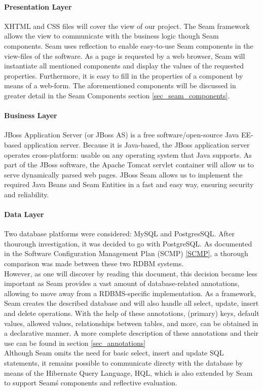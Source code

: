 \documentclass[salesmen, twoside]{../../../templates/latex/2009/softproj}
\begin{document}
\begin{projdoc}
\paragraph{Presentation Layer}
XHTML and CSS files will cover the view of our project. The Seam framework allows the view to communicate with the business logic though Seam components. Seam uses reflection to enable easy-to-use Seam components in the view-files of the software. As a page is requested by a web browser, Seam will instantiate all mentioned components and display the values of the requested properties. Furthermore, it is easy to fill in the properties of a component by means of a web-form. The aforementioned components will be discussed in greater detail in the Seam Components section \ref{sec_seam_components}.

\paragraph{Business Layer}
JBoss Application Server (or JBoss AS) is a free software/open-source Java EE-based application server. Because it is Java-based, the JBoss application server operates cross-platform: usable on any operating system that Java supports. 
As part of the JBoss software, the Apache Tomcat servlet container will allow us to serve dynamically parsed web pages.
JBoss Seam allows us to implement the required Java Beans and Seam Entities in a fast and easy way, ensuring security and reliability.

\paragraph{Data Layer}
Two database platforms were considered: MySQL and PostgresSQL. After thourough investigation, it was decided to go with PostgreSQL. As documented in the Software Configuration Management Plan (SCMP) \ref{SCMP}, a thorough comparison was made between these two RDBM systems.\\
However, as one will discover by reading this document, this decision became less important as Seam provides a vast amount of database-related annotations, allowing to move away from a RDBMS-specific implementation. As a framework, Seam creates the described database and will also handle all select, update, insert and delete operations. With the help of these annotations, (primary) keys, default values, allowed values, relationships between tables, and more, can be obtained in a declarative manner. A more complete description of these annotations and their use can be found in section \ref{sec_annotations}\\
Although Seam omits the need for basic select, insert and update SQL statements, it remains possible to communicate directy with the database by means of the Hibernate Query Language, HQL, which is also extended by Seam to support Seam\'s components and reflective evaluation.


\end{projdoc}
\end{document}
